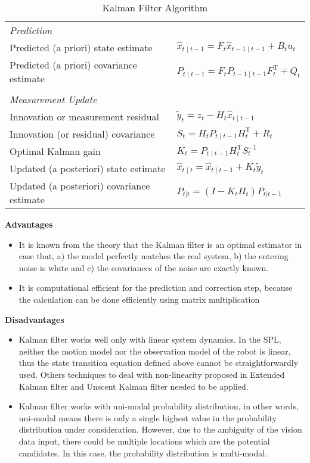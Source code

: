 \begin{table}[h!]
\begin{adjustbox}{max width=\textwidth}
  \centering
  \begin{tabular}{ll}
 \textit{Prediction} & \\
Predicted (a priori) state estimate & $\hat{x}_{t\mid t-1} = F_{t}\hat{x}_{t-1\mid t-1} + B_{t} u_{t}$ \\
Predicted (a priori) covariance estimate & $P_{t\mid t-1} =  F_{t} P_{t-1\mid t-1} F_{t}^{\text{T}} + Q_{t}$\\
&\\
\textit{Measurement Update} & \\
Innovation or measurement residual & $\tilde{y}_t = z_t - H_t\hat{x}_{t\mid t-1}$ \\
Innovation (or residual) covariance & $S_t = H_t P_{t\mid t-1} H_t^\text{T} + R_t$ \\
Optimal Kalman gain & $K_t = P_{t\mid t-1}H_t^\text{T}S_t^{-1}$ \\
Updated (a posteriori) state estimate & $\hat{x}_{t\mid t} = \hat{x}_{t\mid t-1} + K_t\tilde{y}_t$ \\
Updated (a posteriori) covariance estimate & $P_{t|t} = (I - K_t H_t) P_{t|t-1}$ \\
  \end{tabular}
  \end{adjustbox}
  \caption{Kalman Filter Algorithm}
  \label{tab:kf}
\end{table}

\noindent\textbf{Advantages}
\begin{itemize}
  \item  It is known from the theory that the Kalman filter is an optimal estimator in case that, a) the model perfectly matches the real system, b) the entering noise is white and c) the covariances of the noise are exactly known.
  \item  It is computational efficient for the prediction and correction step, because the calculation can be done efficiently using matrix multiplication
\end{itemize}

\noindent\textbf{Disadvantages}
\begin{itemize}
  \item  Kalman filter works well only with linear system dynamics. In the SPL, neither the motion model nor the observation model of the robot is linear, thus the state transition equation defined above cannot be straightforwardly used. Others techniques to deal with non-linearity proposed in Extended Kalman filter and Unscent Kalman filter needed to be applied.
  \item  Kalman filter works with uni-modal probability distribution, in other words, uni-modal means there is only a single highest value in the probability distribution under consideration. However, due to the ambiguity of the vision data input, there could be multiple locations which are the potential candidates. In this case, the probability distribution is multi-modal.
\end{itemize}

